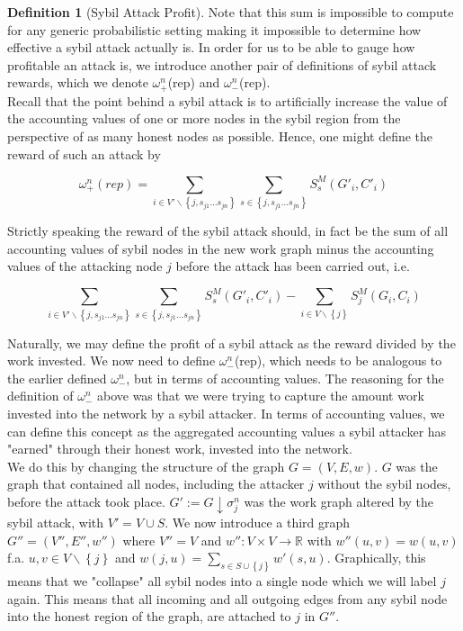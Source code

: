 \documentclass[11pt,a4paper]{article}
\theoremstyle{definition}
\newtheorem{definition}{Definition}[section]
\theoremstyle{theorem}
\theoremstyle{proposition}
\theoremstyle{corollary}
\theoremstyle{lemma}
\theoremstyle{example}
\theoremstyle{remark}
\begin{document}
\begin{definition}[Sybil Attack Profit]
\noindent{}Note that this sum is impossible to compute for any generic probabilistic setting making it impossible to determine how effective a sybil attack actually is. In order for us to be able to gauge how profitable an attack is, we introduce another pair of definitions of sybil attack rewards, which we denote $\omega_{+}^{n}$(rep) and $\omega_{-}^{n}$(rep). \vspace{1em}\\ 

\noindent{}Recall that the point behind a sybil attack is to artificially increase the value of the accounting values of one or more nodes in the sybil region from the perspective of as many honest nodes as possible. Hence, one might define the reward of such an attack by 

\[
\omega_{+}^{n}(\textit{rep}) = \sum\limits_{i\in{}V'\backslash\left\lbrace{}j,s_{j1}\ldots{}s_{jn}\right\rbrace}\sum\limits_{s\in\left\lbrace{}j,s_{j1}\ldots{}s_{jn}\right\rbrace}S^M_s(G'_i,C'_i)
\]

\noindent{}Strictly speaking the reward of the sybil attack should, in fact be the sum of all accounting values of sybil nodes in the new work graph minus the accounting values of the attacking node $j$ before the attack has been carried out, i.e.

\[
\sum\limits_{i\in{}V'\backslash\left\lbrace{}j,s_{j1}\ldots{}s_{jn}\right\rbrace}\sum\limits_{s\in\left\lbrace{}j,s_{j1}\ldots{}s_{jn}\right\rbrace}S^M_s(G'_i,C'_i) - \sum\limits_{i\in{}V\backslash\left\lbrace{}j\right\rbrace}S^M_j(G_i,C_i)
\]

\noindent{}Naturally, we may define the profit of a sybil attack as the reward divided by the work invested. We now need to define $\omega^{n}_{-}$(rep), which needs to be analogous to the earlier defined $\omega_{-}^{n}$, but in terms of accounting values. The reasoning for the definition of $\omega_{-}^{n}$ above was that we were trying to capture the amount work invested into the network by a sybil attacker. In terms of accounting values, we can define this concept as the aggregated accounting values a sybil attacker has "earned" through their honest work, invested into the network. \vspace{1em}\\

\noindent{}We do this by changing the structure of the graph $G=(V,E,w)$. $G$ was the graph that contained all nodes, including the attacker $j$ without the sybil nodes, before the attack took place. $G':=G\downarrow\sigma^n_j$ was the work graph altered by the sybil attack, with $V'=V\cup{}S$. We now introduce a third graph $G''=(V'',E'',w'')$ where $V''=V$ and $w'':V\times{}V\rightarrow\mathbb{R}$ with $w''(u,v)=w(u,v)$ f.a. $u,v\in{}V\backslash\left\lbrace{}j\right\rbrace$ and $w(j,u)=\sum\limits_{s\in{}S\cup\left\lbrace{}j\right\rbrace}w'(s,u)$. Graphically, this means that we "collapse" all sybil nodes into a single node which we will label $j$ again. This means that all incoming and all outgoing edges from any sybil node into the honest region of the graph, are attached to $j$ in $G''$. \vspace{1em}\\


\end{definition}
\end{document}
